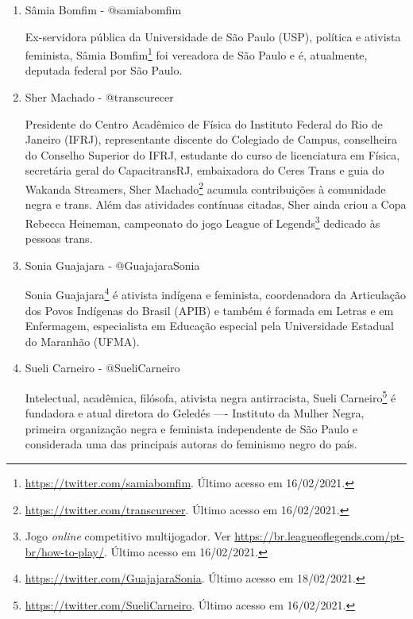 \documentclass[
	12pt,				%
	openright,			%
	twoside,			%
	a4paper,			%
	english,			%
	brazil				%
	]{abntex2}
\begin{document}
\begin{anexosenv}
\begin{enumerate}
 Sabrina Fernandes\footnote{\url{https://twitter.com/safbf}. Último acesso em 18/02/2021.} é socióloga, acadêmica, escritora, professora, \textit{podcaster} e \textit{youtuber}, além de militante feminista, ecossocialista e marxista. Em seu canal Tese Onze, ela aborda temas de gênero e políticos em geral.

 \item Sâmia Bomfim - @samiabomfim
 
 Ex-servidora pública da Universidade de São Paulo (USP), política e ativista feminista, Sâmia Bomfim\footnote{\url{https://twitter.com/samiabomfim}. Último acesso em 16/02/2021.} foi vereadora de São Paulo e é, atualmente, deputada federal por São Paulo.

 \item Sher Machado - @transcurecer
 
 Presidente do Centro Acadêmico de Física do Instituto Federal do Rio de Janeiro (IFRJ), representante discente do Colegiado de Campus, conselheira do Conselho Superior do IFRJ, estudante do curso de licenciatura em Física, secretária geral do CapacitransRJ, embaixadora do Ceres Trans e guia do Wakanda Streamers, Sher Machado\footnote{\url{https://twitter.com/transcurecer}. Último acesso em 16/02/2021.} acumula contribuições à comunidade negra e trans. Além das atividades contínuas citadas, Sher ainda criou a Copa Rebecca Heineman, campeonato do jogo League of Legends\footnote{Jogo \textit{online} competitivo multijogador. Ver \url{https://br.leagueoflegends.com/pt-br/how-to-play/}. Último acesso em 16/02/2021.} dedicado às pessoas trans.

 \item Sonia Guajajara - @GuajajaraSonia
 
 Sonia Guajajara\footnote{\url{https://twitter.com/GuajajaraSonia}. Último acesso em 18/02/2021.} é ativista indígena e feminista, coordenadora da Articulação dos Povos Indígenas do Brasil (APIB) e também é formada em Letras e em Enfermagem, especialista em Educação especial pela Universidade Estadual do Maranhão (UFMA).

 \item Sueli Carneiro - @SueliCarneiro
 
 Intelectual, acadêmica, filósofa, ativista negra antirracista, Sueli Carneiro\footnote{\url{https://twitter.com/SueliCarneiro}. Último acesso em 16/02/2021.} é fundadora e atual diretora do Geledés —- Instituto da Mulher Negra, primeira organização negra e feminista independente de São Paulo e considerada uma das principais autoras do feminismo negro do país.


\end{enumerate}
\end{anexosenv}
\end{document}

